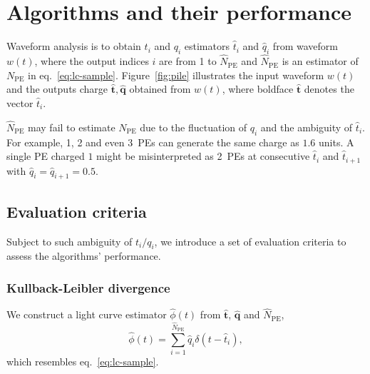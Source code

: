 \section{Algorithms and their performance}
\label{sec:algorithm}

Waveform analysis is to obtain $t_i$ and $q_i$ estimators $\hat{t}_i$ and $\hat{q}_i$ from waveform $w(t)$, where the output indices $i$ are from 1 to $\hat{N}_\mathrm{PE}$ and $\hat{N}_\mathrm{PE}$ is an estimator of $N_\mathrm{PE}$ in eq.~\eqref{eq:lc-sample}. Figure~\ref{fig:pile} illustrates the input waveform $w(t)$ and the outputs charge $\bm{\hat{t}}, \hat{\bm{q}}$ obtained from $w(t)$, where boldface $\hat{\bm{t}}$ denotes the vector $\hat{t}_i$. 

$\hat{N}_\mathrm{PE}$ may fail to estimate $N_\mathrm{PE}$ due to the fluctuation of $q_i$ and the ambiguity of $\hat{t}_i$. For example, 1, 2 and even 3~PEs can generate the same charge as $1.6$ units.  A single PE charged $1$ might be misinterpreted as 2~PEs at consecutive $\hat{t}_i$ and $\hat{t}_{i+1}$ with $\hat{q}_i=\hat{q}_{i+1}=0.5$.

\subsection{Evaluation criteria}
\label{sec:criteria}
Subject to such ambiguity of $t_i/q_i$, we introduce a set of evaluation criteria to assess the algorithms' performance.

\subsubsection{Kullback-Leibler divergence}
\label{sec:pseudo}

We construct a light curve estimator $\hat{\phi}(t)$ from $\bm{\hat{t}}$, $\bm{\hat{q}}$ and $\hat{N}_\mathrm{PE}$,
\begin{equation}
  \label{eq:lc}
  \hat{\phi}(t) = \sum_{i=1}^{\hat{N}_\mathrm{PE}} \hat{q}_i\delta(t-\hat{t}_i),
\end{equation}
which resembles eq.~\eqref{eq:lc-sample}.

